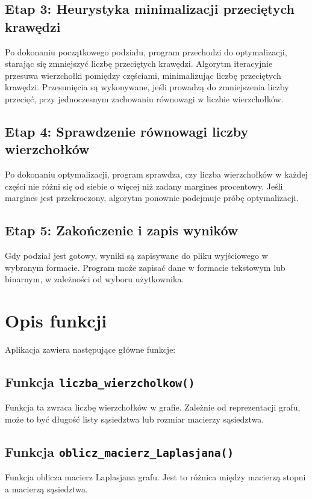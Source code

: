 \documentclass[a4paper,12pt]{article}
\begin{document}
\subsection{Etap 3: Heurystyka minimalizacji przeciętych krawędzi}
Po dokonaniu początkowego podziału, program przechodzi do optymalizacji, starając się zmniejszyć liczbę przeciętych krawędzi. Algorytm iteracyjnie przesuwa wierzchołki pomiędzy częściami, minimalizując liczbę przeciętych krawędzi. Przesunięcia są wykonywane, jeśli prowadzą do zmniejszenia liczby przecięć, przy jednoczesnym zachowaniu równowagi w liczbie wierzchołków.

\subsection{Etap 4: Sprawdzenie równowagi liczby wierzchołków}
Po dokonaniu optymalizacji, program sprawdza, czy liczba wierzchołków w każdej części nie różni się od siebie o więcej niż zadany margines procentowy. Jeśli margines jest przekroczony, algorytm ponownie podejmuje próbę optymalizacji.

\subsection{Etap 5: Zakończenie i zapis wyników}
Gdy podział jest gotowy, wyniki są zapisywane do pliku wyjściowego w wybranym formacie. Program może zapisać dane w formacie tekstowym lub binarnym, w zależności od wyboru użytkownika.

\section{Opis funkcji}

Aplikacja zawiera następujące główne funkcje:

\subsection{Funkcja \texttt{liczba\_wierzcholkow()}}
Funkcja ta zwraca liczbę wierzchołków w grafie. Zależnie od reprezentacji grafu, może to być długość listy sąsiedztwa lub rozmiar macierzy sąsiedztwa.

\subsection{Funkcja \texttt{oblicz\_macierz\_Laplasjana()}}
Funkcja oblicza macierz Laplasjana grafu. Jest to różnica między macierzą stopni a macierzą sąsiedztwa.
\end{document}
